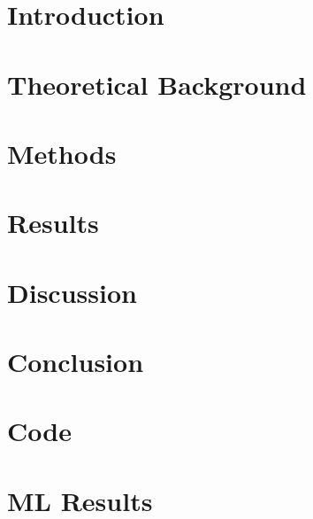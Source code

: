 \documentclass[12pt, bibliography=totoc]{scrartcl}
\begin{document}
    \newpage


    \section{Introduction}
    \label{sec:introduction}
    


    \section{Theoretical Background}
    \label{sec:background}
    


    \section{Methods}
    \label{sec:methods}
    


    \section{Results}
    \label{sec:results}
    


    \section{Discussion}
    \label{sec:discussion}
    


    \section{Conclusion}
    \label{sec:conclusion}
    


    \newpage
    \singlespacing
    \small
    
    \normalsize

    \newpage
    \appendix


    \section{Code}\label{sec:code}
    
    \newpage


    \section{ML Results}\label{sec:ml_results}
    
\end{document}
